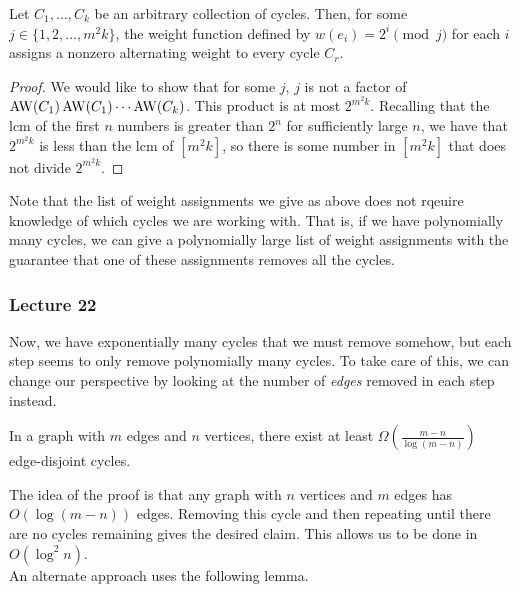 		\begin{fprop}
			Let $C_1,\ldots,C_k$ be an arbitrary collection of cycles. Then, for some $j \in \{1,2,\ldots,m^2k\}$, the weight function defined by $w(e_i) = 2^i \pmod j$ for each $i$ assigns a nonzero alternating weight to every cycle $C_r$.
		\end{fprop}
		\begin{proof}
			We would like to show that for some $j$, $j$ is not a factor of $\operatorname{AW}(C_1) \operatorname{AW}(C_1) \cdots \operatorname{AW}(C_k)$. This product is at most $2^{m^2k}$. Recalling that the lcm of the first $n$ numbers is greater than $2^n$ for sufficiently large $n$, we have that $2^{m^2k}$ is less than the lcm of $[m^2k]$, so there is some number in $[m^2k]$ that does not divide $2^{m^2k}$.
		\end{proof}

		Note that the list of weight assignments we give as above does not rqeuire knowledge of which cycles we are working with. That is, if we have polynomially many cycles, we can give a polynomially large list of weight assignments with the guarantee that one of these assignments removes all the cycles.


	\subsubsection{Lecture 22}

		Now, we have exponentially many cycles that we must remove somehow, but each step seems to only remove polynomially many cycles. To take care of this, we can change our perspective by looking at the number of \emph{edges} removed in each step instead.

		\begin{flem}
			In a graph with $m$ edges and $n$ vertices, there exist at least $\Omega\left(\frac{m-n}{\log(m-n)}\right)$ edge-disjoint cycles.
		\end{flem}
		The idea of the proof is that any graph with $n$ vertices and $m$ edges has $O(\log(m-n))$ edges. Removing this cycle and then repeating until there are no cycles remaining gives the desired claim.
		This allows us to be done in $O(\log^2 n)$.\\
		An alternate approach uses the following lemma.

